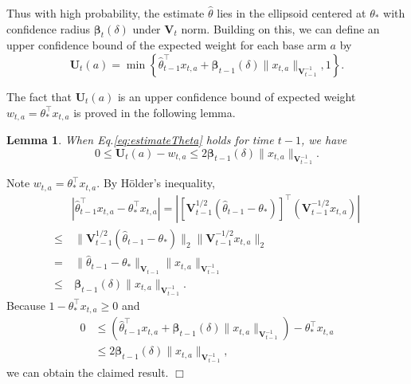 \documentclass{article}
\newcommand{\bbeta}{\boldsymbol{\beta}}
\newcommand{\bU}{\mathbf{U}}
\newcommand{\bV}{\mathbf{V}}
\newcommand{\abs}[1]{\left| #1 \right|}
\newcommand{\norm}[1]{\| #1 \|}
\newtheorem{lemma}[theorem]{Lemma}%
\newenvironment{proof}{\noindent {\textbf{Proof. }}}{$\Box$ \medskip}
\begin{document}
Thus with high probability, the estimate $\hat{\theta}$ lies in the ellipsoid centered at $\theta_*$ with confidence radius $\bbeta_t(\delta)$ under $\bV_t$ norm. 
Building on this, we can define an upper confidence bound of the expected weight for each base arm $a$ by
\begin{equation}
  \label{eq:defU}
  \bU_t(a) = \min\left\{\hat{\theta}_{t-1}^{\top}x_{t,a} + \bbeta_{t-1}(\delta)\norm{x_{t,a}}_{\bV_{t-1}^{-1}}, 1 \right\}.
\end{equation}

The fact that $\bU_t(a)$ is an upper confidence bound of expected weight $w_{t, a} = \theta_*^{\top} x_{t,a}$ is proved in the following lemma.
\begin{lemma} %
  \label{lem:estimateU}
  When Eq.\eqref{eq:estimateTheta} holds for time $t-1$, we have
  $$
    0 \leq \bU_t(a) - w_{t,a} \leq 2 \bbeta_{t-1}(\delta)\norm{x_{t,a}}_{\bV_{t-1}^{-1}}.
  $$
\end{lemma}
\begin{proof}
	Note $w_{t,a} = \theta_*^{\top} x_{t,a}$. By H\"{o}lder's inequality,
	\begin{align*}
		&\abs{\hat{\theta}_{t-1}^{\top}x_{t,a} - \theta_{\ast}^{\top}x_{t,a}} = \abs{[\bV_{t-1}^{1/2}(\hat{\theta}_{t-1} - \theta_{\ast})]^{\top} (\bV_{t-1}^{-1/2}x_{t,a})}\\
		\leq &~\norm{\bV_{t-1}^{1/2}(\hat{\theta}_{t-1} - \theta_{\ast})}_2 \norm{\bV_{t-1}^{-1/2}x_{t,a}}_2\\
		=&~\norm{\hat{\theta}_{t-1} - \theta_{\ast}}_{\bV_{t-1}} \norm{x_{t,a}}_{\bV_{t-1}^{-1}} \\
		\leq&~ \bbeta_{t-1}(\delta)\norm{x_{t,a}}_{\bV_{t-1}^{-1}}.
	\end{align*}
	Because $1 - \theta_*^{\top} x_{t,a} \geq 0$ and
	\begin{align*}
		0 &\leq (\hat{\theta}_{t-1}^{\top}x_{t,a} + \bbeta_{t-1}(\delta)\norm{x_{t,a}}_{\bV_{t-1}^{-1}}) - \theta_{\ast}^{\top}x_{t,a} \\
		&\leq 2 \bbeta_{t-1}(\delta)\norm{x_{t,a}}_{\bV_{t-1}^{-1}},
	\end{align*}
	we can obtain the claimed result.
\end{proof}
\end{document}
